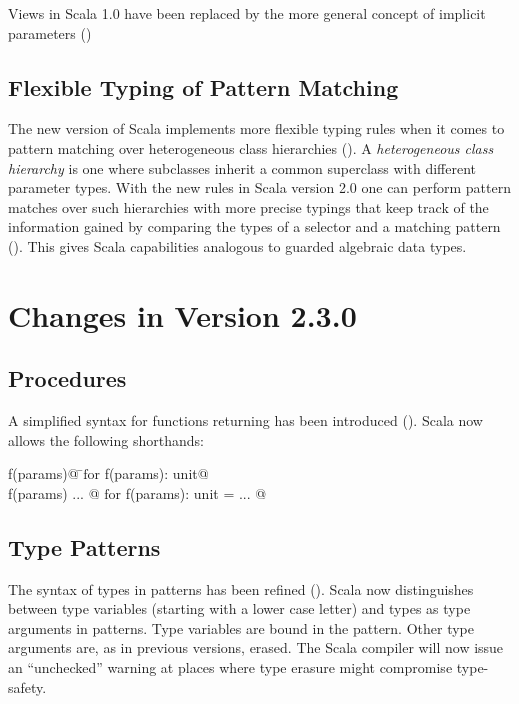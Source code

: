 Views in Scala 1.0 have been replaced by the more general concept of
implicit parameters ()

\subsection*{Flexible Typing of Pattern Matching}

The new version of Scala implements more flexible typing rules when it
comes to pattern matching over heterogeneous class hierarchies
(). A {\em heterogeneous class hierarchy} is
one where subclasses inherit a common superclass with different
parameter types.  With the new rules in Scala version 2.0 one can
perform pattern matches over such hierarchies with more precise
typings that keep track of the information gained by comparing the
types of a selector and a matching pattern ().
This gives Scala capabilities analogous to guarded algebraic data types.

\section{Changes in Version 2.3.0}

\subsection*{Procedures} A simplified syntax for functions returning
\lstinline@unit@ has been introduced (). 
Scala now allows the following shorthands:

\begin{tabbing}
\lstinline@def f(params)@     \tab\tab\tab \=$\mbox{for}$  \tab
\lstinline@def f(params): unit@ \\
\lstinline@def f(params) { ... }@  \>$\mbox{for}$    \tab
\lstinline@def f(params): unit = { ... }@
\end{tabbing}

\subsection*{Type Patterns} The syntax of types in patterns has been 
refined (). Scala now distinguishes between
type variables (starting with a lower case letter) and types as type
arguments in patterns.  Type variables are bound in the pattern. Other
type arguments are, as in previous versions, erased. The Scala
compiler will now issue an ``unchecked'' warning at places where type
erasure might compromise type-safety.


